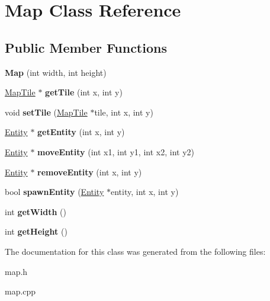 \hypertarget{class_map}{}\section{Map Class Reference}
\label{class_map}
\subsection*{Public Member Functions}
\begin{DoxyCompactItemize}
\item 
\hypertarget{class_map_a8497952fd6e1f0584d868e6ceb97d42d}{}{\bfseries Map} (int width, int height)\label{class_map_a8497952fd6e1f0584d868e6ceb97d42d}

\item 
\hypertarget{class_map_a70adeb57203a2726cd5b2cbcf25628c5}{}\hyperlink{class_map_tile}{Map\+Tile} $\ast$ {\bfseries get\+Tile} (int x, int y)\label{class_map_a70adeb57203a2726cd5b2cbcf25628c5}

\item 
\hypertarget{class_map_a6163461180ebdb9acc0f2e9ecb768dd2}{}void {\bfseries set\+Tile} (\hyperlink{class_map_tile}{Map\+Tile} $\ast$tile, int x, int y)\label{class_map_a6163461180ebdb9acc0f2e9ecb768dd2}

\item 
\hypertarget{class_map_ac0a654733e7899a88c587e5c3cb7cc00}{}\hyperlink{class_entity}{Entity} $\ast$ {\bfseries get\+Entity} (int x, int y)\label{class_map_ac0a654733e7899a88c587e5c3cb7cc00}

\item 
\hypertarget{class_map_a12d3a76479f42bcac72d866a9f2cd343}{}\hyperlink{class_entity}{Entity} $\ast$ {\bfseries move\+Entity} (int x1, int y1, int x2, int y2)\label{class_map_a12d3a76479f42bcac72d866a9f2cd343}

\item 
\hypertarget{class_map_a7bc197a79eaab24f953721a7e1909cf0}{}\hyperlink{class_entity}{Entity} $\ast$ {\bfseries remove\+Entity} (int x, int y)\label{class_map_a7bc197a79eaab24f953721a7e1909cf0}

\item 
\hypertarget{class_map_acd22fe6b636278d8b26b5aca44d8897b}{}bool {\bfseries spawn\+Entity} (\hyperlink{class_entity}{Entity} $\ast$entity, int x, int y)\label{class_map_acd22fe6b636278d8b26b5aca44d8897b}

\item 
\hypertarget{class_map_afd34d12227676b3cebeed9f5fae2508f}{}int {\bfseries get\+Width} ()\label{class_map_afd34d12227676b3cebeed9f5fae2508f}

\item 
\hypertarget{class_map_a2b09c8875af2efb711fc3a022e70427d}{}int {\bfseries get\+Height} ()\label{class_map_a2b09c8875af2efb711fc3a022e70427d}

\end{DoxyCompactItemize}


The documentation for this class was generated from the following files\+:\begin{DoxyCompactItemize}
\item 
map.\+h\item 
map.\+cpp\end{DoxyCompactItemize}
